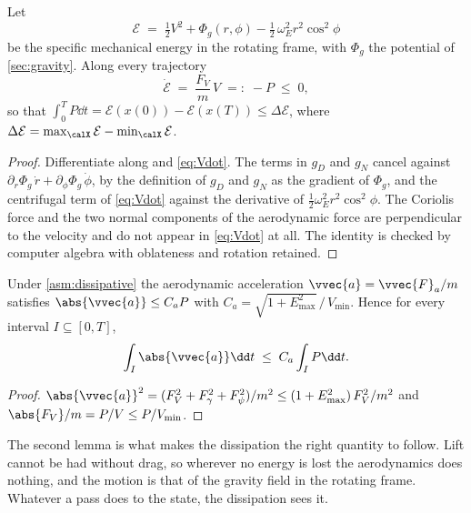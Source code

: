 \begin{lem}\label{lem:energy}
Let
\[
  \mathcal{E} \;=\; \tfrac12 V^2 + \Phi_g(r,\phi)
                    - \tfrac12\,\omega_E^2 r^2\cos^2\!\phi
\]
be the specific mechanical energy in the rotating frame, with $\Phi_g$ the
potential of \cref{sec:gravity}. Along every trajectory
\begin{equation}\label{eq:dissipation}
  \dot{\mathcal{E}} \;=\; \frac{F_V}{m}\,V \;=:\; -P \;\le\; 0 ,
\end{equation}
so that $\int_0^T P\dd t = \mathcal{E}(x(0)) - \mathcal{E}(x(T))
\le \Delta\mathcal{E}$, where
$\Delta\mathcal{E} = \max_{\calX}\mathcal{E} - \min_{\calX}\mathcal{E}$.
\end{lem}

\begin{proof}
Differentiate along  and \cref{eq:Vdot}. The
terms in $g_D$ and $g_N$ cancel against
$\partial_r\Phi_g\,\dot r + \partial_\phi\Phi_g\,\dot\phi$, by the
definition of $g_D$ and $g_N$ as the gradient of $\Phi_g$, and the
centrifugal term of \cref{eq:Vdot} against the derivative of
$\tfrac12\omega_E^2r^2\cos^2\!\phi$. The Coriolis force and the two normal
components of the aerodynamic force are perpendicular to the velocity and
do not appear in \cref{eq:Vdot} at all. The identity is checked by computer
algebra with oblateness and rotation retained.
\end{proof}

\begin{lem}\label{lem:impulse}
Under \cref{asm:dissipative} the aerodynamic acceleration
$\vvec{a} = \vvec{F}_a/m$ satisfies $\abs{\vvec{a}} \le C_a P$ with
$C_a = \sqrt{1+E_{\max}^2}\,/\,V_{\min}$. Hence for every interval
$I\subseteq[0,T]$,
\[
  \int_I \abs{\vvec{a}}\dd t \;\le\; C_a\int_I P\dd t .
\]
\end{lem}

\begin{proof}
$\abs{\vvec{a}}^2 = (F_V^2 + F_\gamma^2 + F_\psi^2)/m^2
\le (1+E_{\max}^2)\,F_V^2/m^2$ and $\abs{F_V}/m = P/V \le P/V_{\min}$.
\end{proof}

The second lemma is what makes the dissipation the right quantity to follow.
Lift cannot be had without drag, so wherever no energy is lost the
aerodynamics does nothing, and the motion is that of the gravity field in
the rotating frame. Whatever a pass does to the state, the dissipation sees
it.

